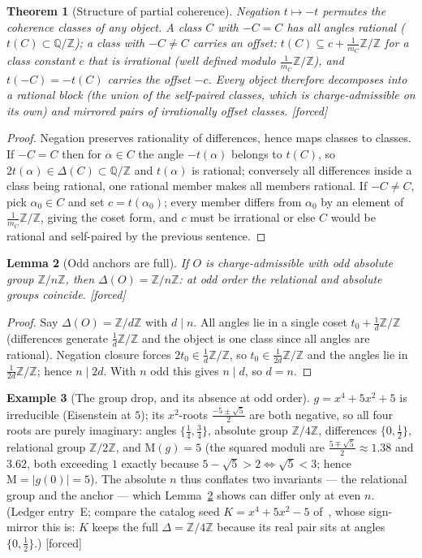 \documentclass[11pt]{article}
\theoremstyle{plain}
\newtheorem{theorem}{Theorem}[section]
\newtheorem{lemma}[theorem]{Lemma}
\theoremstyle{definition}
\newtheorem{example}[theorem]{Example}
\theoremstyle{remark}
\newcommand{\Q}{\mathbb{Q}}
\newcommand{\Z}{\mathbb{Z}}
\newcommand{\Mah}{\mathrm{M}}
\newcommand{\tors}{\Q/\Z}
\newcommand{\F}{\textnormal{[forced]}}
\begin{document}
\begin{theorem}[Structure of partial coherence]\label{thm:structure}
Negation $t\mapsto -t$ permutes the coherence classes of any object. A class $C$
with $-C=C$ has all angles rational ($t(C)\subset\tors$); a class with
$-C\neq C$ carries an offset: $t(C)\subseteq c+\frac{1}{m_C}\Z/\Z$ for a class
constant $c$ that is irrational (well defined modulo $\frac{1}{m_C}\Z/\Z$), and
$t(-C)=-t(C)$ carries the offset $-c$. Every object therefore decomposes into a
\emph{rational block} (the union of the self-paired classes, which is
charge-admissible on its own) and mirrored pairs of irrationally offset classes.
\F
\end{theorem}

\begin{proof}
Negation preserves rationality of differences, hence maps classes to classes. If
$-C=C$ then for $\alpha\in C$ the angle $-t(\alpha)$ belongs to $t(C)$, so
$2t(\alpha)\in\Delta(C)\subset\tors$ and $t(\alpha)$ is rational; conversely all
differences inside a class being rational, one rational member makes all members
rational. If $-C\neq C$, pick $\alpha_0\in C$ and set $c=t(\alpha_0)$; every
member differs from $\alpha_0$ by an element of $\frac{1}{m_C}\Z/\Z$, giving the
coset form, and $c$ must be irrational or else $C$ would be rational and
self-paired by the previous sentence.
\end{proof}

\begin{lemma}[Odd anchors are full]\label{lem:oddfull}
If $O$ is charge-admissible with odd absolute group $\Z/n\Z$, then
$\Delta(O)=\Z/n\Z$: at odd order the relational and absolute groups coincide. \F
\end{lemma}

\begin{proof}
Say $\Delta(O)=\Z/d\Z$ with $d\mid n$. All angles lie in a single coset
$t_0+\frac1d\Z/\Z$ (differences generate $\frac1d\Z/\Z$ and the object is one
class since all angles are rational). Negation closure forces
$2t_0\in\frac1d\Z/\Z$, so $t_0\in\frac{1}{2d}\Z/\Z$ and the angles lie in
$\frac{1}{2d}\Z/\Z$; hence $n\mid 2d$. With $n$ odd this gives $n\mid d$, so
$d=n$.
\end{proof}

\begin{example}[The group drop, and its absence at odd order]\label{ex:drop}
$g=x^4+5x^2+5$ is irreducible (Eisenstein at $5$); its $x^2$-roots
$\frac{-5\pm\sqrt5}{2}$ are both negative, so all four roots are purely
imaginary: angles $\{\tfrac14,\tfrac34\}$, absolute group $\Z/4\Z$, differences
$\{0,\tfrac12\}$, relational group $\Z/2\Z$, and $\Mah(g)=5$ (the squared
moduli are $\frac{5\mp\sqrt5}{2}\approx1.38$ and $3.62$, both exceeding $1$
exactly because $5-\sqrt5>2\iff\sqrt5<3$; hence $\Mah=|g(0)|=5$). The absolute $n$ thus conflates two invariants ---
the relational group and the anchor --- which Lemma~\ref{lem:oddfull} shows can
differ only at even $n$. (Ledger entry~E; compare the catalog seed
$K=x^4+5x^2-5$ of~\cite{CMC}, whose sign-mirror this is: $K$ keeps the full
$\Delta=\Z/4\Z$ because its real pair sits at angles $\{0,\tfrac12\}$.) \F
\end{example}
\end{document}
